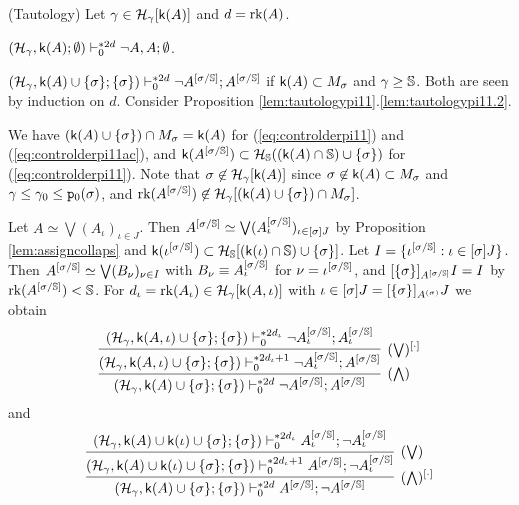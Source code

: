 \documentclass{article}
\newcommand{\mS}{\mathbb{S}}
\begin{document}
\bprp\label{lem:tautologypi11}{\rm (Tautology)}
Let $\gamma\in{\cal H}_{\gamma}[{\sf k}(A)]$ and $d=\mbox{{\rm rk}}(A)$.
\benu
\item\label{lem:tautologypi11.1}
$(\mathcal{H}_{\gamma},{\sf k}(A);\emptyset
)\vdash^{* 2d}_{0}
\lnot A, A; \emptyset$.

\item\label{lem:tautologypi11.2}
$(\mathcal{H}_{\gamma},{\sf k}(A)\cup\{\sig\};\{\sig\}
)\vdash^{* 2d}_{0}
\lnot A^{[\sig/\mS]};A^{[\sig/\mS]}$ if ${\sf k}(A)\subset M_{\sigma}$ and $\gam\geq\mS$.
\eenu
\eprp
\bprf
Both are seen by induction on $d$.
Consider Proposition \ref{lem:tautologypi11}.\ref{lem:tautologypi11.2}.

We have $({\sf k}(A)\cup\{\sigma\})\cap M_{\sigma}={\sf k}(A)$ for (\ref{eq:controlderpi11}) and (\ref{eq:controlderpi11ac}),
and $\sfk(A^{[\sig/\mS]})\subset\calh_{\mS}((\sfk(A)\cap\mS)\cup\{\sig\})$ for (\ref{eq:controlderpi11}).
Note that 
$\sigma\not\in\mathcal{H}_{\gamma}[{\sf k}(A)]$ since $\sigma\not\in{\sf k}(A)\subset M_{\sigma}$ and 
$\gamma\leq\gamma_{0}\leq{\tt p}_{0}(\sigma)$, and 
$\rk(A^{[\sig/\mS]})\not\in\mathcal{H}_{\gamma}[(\sfk(A)\cup\{\sig\})\cap M_{\sig}]$.

Let $A\simeq\bigvee(A_{\iota})_{\iota\in J}$.
Then $A^{[\sig/\mS]}\simeq\bigvee(A_{\iota}^{[\sig/\mS]})_{\iota\in [\sig]J}$ by 
Proposition \ref{lem:assigncollaps} and
$\sfk(\iota^{[\sig/\mS]})\subset\calh_{\mS}[(\sfk(\iota)\cap\mS)\cup\{\sig\}]$.
Let $I=\{\iota^{[\sig/\mS]}: \iota\in[\sig]J\}$.
Then $A^{[\sig/\mS]}\simeq\bigvee(B_{\nu})_{\nu\in I}$ with $B_{\nu}\equiv A_{\iota}^{[\sig/\mS]}$ for $\nu=\iota^{[\sig/\mS]}$,
and
$[\{\sig\}]_{A^{[\sig/\mS]}} I=I$ 
by $\rk(A^{[\sig/\mS]})<\mS$.
For $d_{\iota}=\mbox{{\rm rk}}(A_{\iota})\in{\cal H}_{\gamma}[{\sf k}(A,\iota)]$ with $\iota\in[\sigma]J=[\{\sigma\}]_{A^{(\sigma)}}J$ 
we obtain
\[
\infer[(\bigwedge)]{(\mathcal{H}_{\gamma},{\sf k}(A)\cup\{\sig\};\{\sig\})\vdash^{* 2d}_{0}
\lnot A^{[\sig/\mS]}; A^{[\sig/\mS]}}
{
\infer[(\bigvee)^{[\cdot]}]{(\mathcal{H}_{\gamma},{\sf k}(A,\iota)\cup\{\sig\};\{\sig\})\vdash^{* 2d_{\iota}+1}_{0}
\lnot A_{\iota}^{[\sig/\mS]}; A^{[\sig/\mS]}}
 {
  (\mathcal{H}_{\gamma},{\sf k}(A,\iota)\cup\{\sig\};\{\sig\})\vdash^{* 2d_{\iota}}_{0}
\lnot A_{\iota}^{[\sig/\mS]}; A_{\iota}^{[\sig/\mS]}
 }
}
\]
and
\[
\infer[(\bigwedge)^{[\cdot]}]{(\mathcal{H}_{\gamma},{\sf k}(A)\cup\{\sig\}; \{\sig\})\vdash^{* 2d}_{0}
A^{[\sig/\mS]}; \lnot A^{[\sig/\mS]}}
{
\infer[(\bigvee)]{(\mathcal{H}_{\gamma},{\sf k}(A)\cup\sfk(\iota)\cup\{\sig\}; \{\sig\})\vdash^{* 2d_{\iota}+1}_{0}
A^{[\sig/\mS]}; \lnot A_{\iota}^{[\sig/\mS]}}
 {
  (\mathcal{H}_{\gamma},{\sf k}(A)\cup\sfk(\iota)\cup\{\sig\}; \{\sig\})\vdash^{* 2d_{\iota}}_{0}
A_{\iota}^{[\sig/\mS]}; \lnot A_{\iota}^{[\sig/\mS]}
 }
}
\]
\eprf
\end{document}
